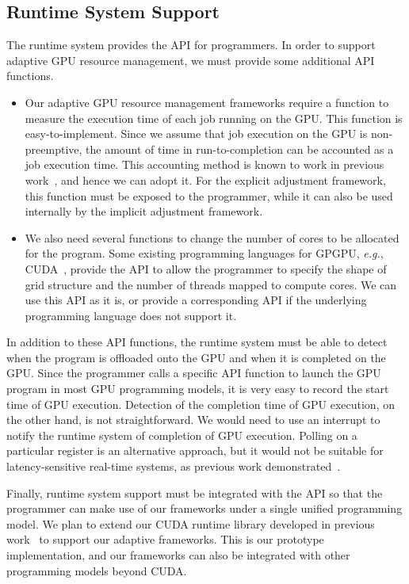 \documentclass[times, 10pt, twocolumn]{article}
\begin{document}
\subsection{Runtime System Support}
\label{sec:runtime}

The runtime system provides the API for programmers.
In order to support adaptive GPU resource management, we must provide
some additional API functions.

\begin{itemize}
 \item Our adaptive GPU resource management frameworks require a
       function to measure the execution time of each job running on the
       GPU.
       This function is easy-to-implement.
       Since we assume that job execution on the GPU is non-preemptive,
       the amount of time in run-to-completion can be accounted as a job
       execution time.
       This accounting method is known to work in previous
       work~\cite{Kato_ATC11, Rossbach_SOSP11}, and hence we can adopt
       it.
       For the explicit adjustment framework, this function must be
       exposed to the programmer, while it can also be used internally
       by the implicit adjustment framework.
 \item We also need several functions to change the number of cores to
       be allocated for the program.
       Some existing programming languages for GPGPU, \textit{e.g.},
       CUDA~\cite{CUDA}, provide the API to allow the programmer to
       specify the shape of grid structure and the number of threads
       mapped to compute cores.
       We can use this API as it is, or provide a corresponding API if
       the underlying programming language does not support it.
\end{itemize}

In addition to these API functions, the runtime system must be able to
detect when the program is offloaded onto the GPU and when it is
completed on the GPU.
Since the programmer calls a specific API function to launch the GPU
program in most GPU programming models, it is very easy to record the
start time of GPU execution.
Detection of the completion time of GPU execution, on the other hand, is
not straightforward.
We would need to use an interrupt to notify the runtime system of
completion of GPU execution.
Polling on a particular register is an alternative approach, but it
would not be suitable for latency-sensitive real-time systems, as
previous work demonstrated~\cite{Kato_ATC11}.

Finally, runtime system support must be integrated with the API so that
the programmer can make use of our frameworks under a single unified
programming model.
We plan to extend our CUDA runtime library developed in previous
work~\cite{Kato_OSPERT11} to support our adaptive frameworks.
This is our prototype implementation, and our frameworks can also be
integrated with other programming models beyond CUDA.
\end{document}
